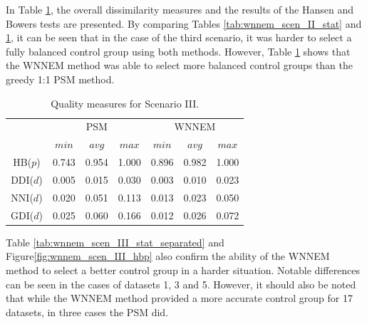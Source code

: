		In Table \ref{tab:wnnem_scen_II2I_stat}, the overall dissimilarity measures and the results of the Hansen and Bowers tests are presented. By comparing Tables \ref{tab:wnnem_scen_II_stat} and \ref{tab:wnnem_scen_II2I_stat}, it can be seen that in the case of the third scenario, it was harder to select a fully balanced control group using both methods. However, Table \ref{tab:wnnem_scen_II2I_stat} shows that the WNNEM method was able to select more balanced control groups than the greedy 1:1 PSM method.
								
		\begin{table}[h]
			\caption{Quality measures for Scenario III.%
			}
			\label{tab:wnnem_scen_II2I_stat}
			\centering
			\begin{tabular}{ccccccc} 
				\toprule
				& \multicolumn{3}{c}{PSM} 
				& \multicolumn{3}{c}{WNNEM}\\
				         & $min$ & $avg$ & $max$ & $min$ & $avg$ & $max$ \\
				\midrule
				HB($p$)  & 0.743 & 0.954 & 1.000 & 0.896 & 0.982 & 1.000 \\
				DDI($d$) & 0.005 & 0.015 & 0.030 & 0.003 & 0.010 & 0.023 \\
				\midrule
				NNI($d$) & 0.020 & 0.051 & 0.113 & 0.013 & 0.023 & 0.050 \\
				GDI($d$) & 0.025 & 0.060 & 0.166 & 0.012 & 0.026 & 0.072 \\
				\bottomrule
			\end{tabular}
		\end{table}
								
		Table \ref{tab:wnnem_scen_III_stat_separated} and Figure\ref{fig:wnnem_scen_III_hbp} also confirm the ability of the WNNEM method to select a better control group in a harder situation. Notable differences can be seen in the cases of datasets 1, 3 and 5. However, it should also be noted that while the WNNEM method provided a more accurate control group for 17 datasets, in three cases the PSM did.
								
